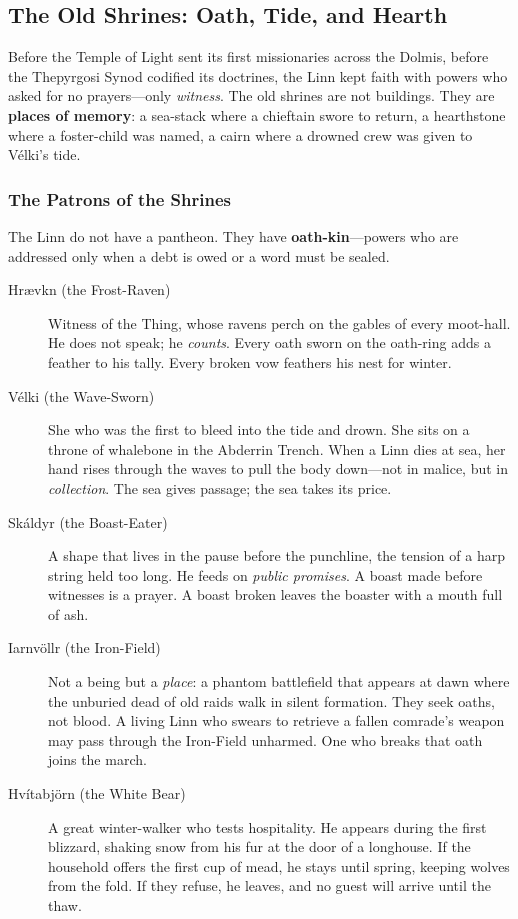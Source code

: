 \documentclass[11pt]{article}
\begin{document}
\subsection{The Old Shrines: Oath, Tide, and Hearth}

Before the Temple of Light sent its first missionaries across the Dolmis, before the Thepyrgosi Synod codified its doctrines, the Linn kept faith with powers who asked for no prayers---only \textit{witness}. The old shrines are not buildings. They are \textbf{places of memory}: a sea-stack where a chieftain swore to return, a hearthstone where a foster-child was named, a cairn where a drowned crew was given to Vélki's tide.

\subsubsection{The Patrons of the Shrines}

The Linn do not have a pantheon. They have \textbf{oath-kin}---powers who are addressed only when a debt is owed or a word must be sealed.

\begin{description}
\item[Hrævkn (the Frost-Raven)] Witness of the Thing, whose ravens perch on the gables of every moot-hall. He does not speak; he \textit{counts}. Every oath sworn on the oath-ring adds a feather to his tally. Every broken vow feathers his nest for winter.

\item[Vélki (the Wave-Sworn)] She who was the first to bleed into the tide and drown. She sits on a throne of whalebone in the Abderrin Trench. When a Linn dies at sea, her hand rises through the waves to pull the body down---not in malice, but in \textit{collection}. The sea gives passage; the sea takes its price.

\item[Skáldyr (the Boast-Eater)] A shape that lives in the pause before the punchline, the tension of a harp string held too long. He feeds on \textit{public promises}. A boast made before witnesses is a prayer. A boast broken leaves the boaster with a mouth full of ash.

\item[Iarnvöllr (the Iron-Field)] Not a being but a \textit{place}: a phantom battlefield that appears at dawn where the unburied dead of old raids walk in silent formation. They seek oaths, not blood. A living Linn who swears to retrieve a fallen comrade's weapon may pass through the Iron-Field unharmed. One who breaks that oath joins the march.

\item[Hvítabjörn (the White Bear)] A great winter-walker who tests hospitality. He appears during the first blizzard, shaking snow from his fur at the door of a longhouse. If the household offers the first cup of mead, he stays until spring, keeping wolves from the fold. If they refuse, he leaves, and no guest will arrive until the thaw.
\end{description}
\end{document}
